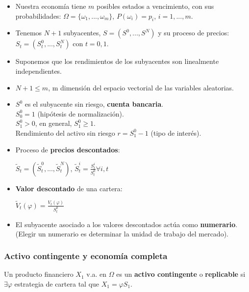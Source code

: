 \documentclass[
10pt, %
a4paper, %
oneside, %
headinclude,footinclude, %
BCOR5mm, %
]{scrartcl}
\newcommand{\n}[1]{\textbf{#1}}
\newcommand{\sub}[1]{_{#1}}
\newcommand{\pot}[1]{^{#1}}
\newcommand{\f}[1]{{\large{${#1}$}}}
\newcounter{ex}
\begin{document}
		\begin{itemize}
			\item Nuestra economía tiene \f{m} posibles estados a vencimiento, con sus probabilidades: \f{\Omega = \{\omega\sub{1},...,\omega\sub{m}\}}, \f{P(\omega\sub{i}) = p\sub{i}}, \f{i = 1,...,m}.
			\item Tenemos \f{N+1} subyacentes, \f{S = (S\pot{0},...,S\pot{N})} y su proceso de precios: \f{S\sub{t} = (S\sub{t}\pot{0},..., S\sub{t}\pot{N})} con \f{t = 0,1}.
			\item Suponemos que los rendimientos de los subyacentes son linealmente independientes. 
			\item \f{N+1 \leq m}, m dimensión del espacio vectorial de las variables aleatorias.
			\item \f{S\pot{0}} es el subyacente sin riesgo, \n{cuenta bancaria}. \\ \f{S\sub{0}\pot{0} = 1} (hipótesis de normalización).
			\\ \f{S\sub{1}\pot{0} > 0}, en general, \f{S\sub{1}\pot{0} \geq 1}.
			\\ Rendimiento del activo sin riesgo \f{r = S\sub{1}\pot{0} - 1} (tipo de interés).
			\item Proceso de \n{precios descontados}:
			\begin{center} \f{\tilde{S}\sub{t} = (\tilde{S}\sub{t}\pot{0},...,\tilde{S}\sub{t}\pot{N})}, \f{\tilde{S}\pot{i}\sub{t} = \frac{S\sub{t}\pot{i}}{S\sub{t}\pot{0}} \forall i, t} \end{center}
			\item \n{Valor descontado} de una cartera:
			\begin{center} \f{\tilde{V}\sub{t}(\varphi) = \frac{V\sub{t}(\varphi)}{S\sub{t}\pot{0}}} \end{center}
			\item El subyacente asociado a los valores descontados actúa como \n{numerario}. (Elegir un numerario es determinar la unidad de trabajo del mercado).
		\end{itemize}

		\subsubsection{Activo contingente y economía completa}

			Un producto financiero \f{X\sub{1}} v.a. en \f{\Omega} es un \n{activo contingente} o \n{replicable} si \f{\exists \varphi} estrategia de cartera tal que \f{X\sub{1} = \varphi S\sub{1}}.
\end{document}
